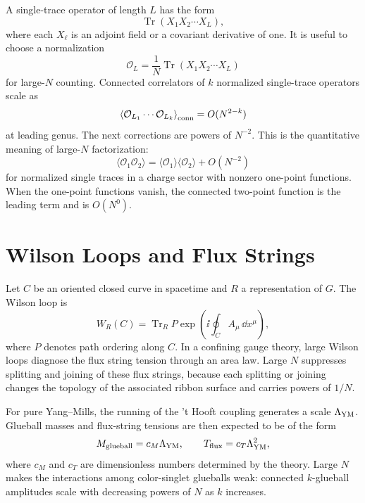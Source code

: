 A single-trace operator of length \(L\) has the form
\[
  \operatorname{Tr}(X_1X_2\cdots X_L),
\]
where each \(X_\ell\) is an adjoint field or a covariant derivative of one.
It is useful to choose a normalization
\[
  \mathcal O_L
  =
  \frac1N
  \operatorname{Tr}(X_1X_2\cdots X_L)
\]
for large-\(N\) counting.  Connected correlators of \(k\) normalized
single-trace operators scale as
\begin{equation}
  \left\langle
    \mathcal O_{L_1}\cdots\mathcal O_{L_k}
  \right\rangle_{\rm conn}
  =
  O(N^{2-k})
  \label{eq:large-n-connected-correlator-scaling}
\end{equation}
at leading genus.  The next corrections are powers of \(N^{-2}\).  This is
the quantitative meaning of large-\(N\) factorization:
\[
  \langle \mathcal O_1\mathcal O_2\rangle
  =
  \langle \mathcal O_1\rangle\langle \mathcal O_2\rangle
  +O(N^{-2})
\]
for normalized single traces in a charge sector with nonzero one-point
functions.  When the one-point functions vanish, the connected two-point
function is the leading term and is \(O(N^0)\).

\section{Wilson Loops and Flux Strings}

Let \(C\) be an oriented closed curve in spacetime and \(R\) a representation
of \(G\).  The Wilson loop is
\begin{equation}
  W_R(C)
  =
  \operatorname{Tr}_R
  P\exp\left(\ii\oint_C A_\mu\,\dd x^\mu\right),
  \label{eq:large-n-wilson-loop}
\end{equation}
where \(P\) denotes path ordering along \(C\).  In a confining gauge theory,
large Wilson loops diagnose the flux string tension through an area law.
Large \(N\) suppresses splitting and joining of these flux strings, because
each splitting or joining changes the topology of the associated ribbon
surface and carries powers of \(1/N\).

For pure Yang--Mills, the running of the 't Hooft coupling generates a scale
\(\Lambda_{\rm YM}\).  Glueball masses and flux-string tensions are then
expected to be of the form
\[
  M_{\rm glueball}=c_M\Lambda_{\rm YM},
  \qquad
  T_{\rm flux}=c_T\Lambda_{\rm YM}^2,
\]
where \(c_M\) and \(c_T\) are dimensionless numbers determined by the theory.
Large \(N\) makes the interactions among color-singlet glueballs weak:
connected \(k\)-glueball amplitudes scale with decreasing powers of \(N\) as
\(k\) increases.

